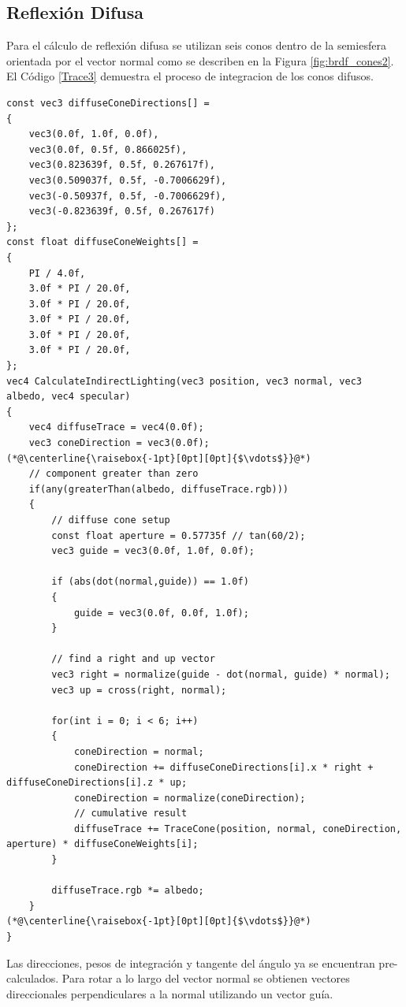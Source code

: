\subsection{Reflexión Difusa} %
\label{sub:reflexion_difuse}
Para el cálculo de reflexión difusa se utilizan seis conos dentro de la semiesfera orientada por el vector normal como se describen en la Figura \ref{fig:brdf_cones2}. El Código \ref{Trace3} demuestra el proceso de integracion de los conos difusos.
\\
\begin{lstlisting}[caption={Conos para reflexión difusa.}, label=Trace3]
const vec3 diffuseConeDirections[] =
{
    vec3(0.0f, 1.0f, 0.0f),
    vec3(0.0f, 0.5f, 0.866025f),
    vec3(0.823639f, 0.5f, 0.267617f),
    vec3(0.509037f, 0.5f, -0.7006629f),
    vec3(-0.50937f, 0.5f, -0.7006629f),
    vec3(-0.823639f, 0.5f, 0.267617f)
};
const float diffuseConeWeights[] =
{
    PI / 4.0f,
    3.0f * PI / 20.0f,
    3.0f * PI / 20.0f,
    3.0f * PI / 20.0f,
    3.0f * PI / 20.0f,
    3.0f * PI / 20.0f,
};
vec4 CalculateIndirectLighting(vec3 position, vec3 normal, vec3 albedo, vec4 specular)
{
    vec4 diffuseTrace = vec4(0.0f);
    vec3 coneDirection = vec3(0.0f);
(*@\centerline{\raisebox{-1pt}[0pt][0pt]{$\vdots$}}@*)
    // component greater than zero
    if(any(greaterThan(albedo, diffuseTrace.rgb)))
    {
        // diffuse cone setup
        const float aperture = 0.57735f // tan(60/2);
        vec3 guide = vec3(0.0f, 1.0f, 0.0f);

        if (abs(dot(normal,guide)) == 1.0f)
        {
            guide = vec3(0.0f, 0.0f, 1.0f);
        }

        // find a right and up vector
        vec3 right = normalize(guide - dot(normal, guide) * normal);
        vec3 up = cross(right, normal);

        for(int i = 0; i < 6; i++)
        {
            coneDirection = normal;
            coneDirection += diffuseConeDirections[i].x * right + diffuseConeDirections[i].z * up;
            coneDirection = normalize(coneDirection);
            // cumulative result
            diffuseTrace += TraceCone(position, normal, coneDirection, aperture) * diffuseConeWeights[i];
        }

        diffuseTrace.rgb *= albedo;
    }
(*@\centerline{\raisebox{-1pt}[0pt][0pt]{$\vdots$}}@*)
}
\end{lstlisting}
Las direcciones, pesos de integración y tangente del ángulo ya se encuentran pre-calculados. Para rotar a lo largo del vector normal se obtienen vectores direccionales perpendiculares a la normal utilizando un vector guía.
